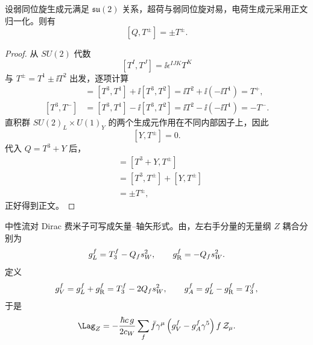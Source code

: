 \begin{proposition}[升降生成元的电荷对易关系]
设弱同位旋生成元满足 $\mathfrak{su}(2)$ 关系，超荷与弱同位旋对易，电荷生成元采用正文归一化。则有
\begin{equation}
{[Q,T^\pm]=\pm T^\pm.}
\label{eq:sm-w-charge-commutator-dp122}
\end{equation}
\end{proposition}
\begin{proof}
从 $SU(2)$ 代数
\[
[T^I,T^J]=\ii\epsilon^{IJK}T^K
\]
与 $T^\pm=T^1\pm\ii T^2$ 出发，逐项计算
\begin{align*}
[T^3,T^+]
&=[T^3,T^1]+\ii[T^3,T^2]
=\ii T^2+\ii(-\ii T^1)
=T^+,\\
[T^3,T^-]
&=[T^3,T^1]-\ii[T^3,T^2]
=\ii T^2-\ii(-\ii T^1)
=-T^-.
\end{align*}
直积群 $SU(2)_L\times U(1)_Y$ 的两个生成元作用在不同内部因子上，因此
\[
[Y,T^\pm]=0.
\]
代入 $Q=T^3+Y$ 后，
\begin{align*}
[Q,T^\pm]
&=[T^3+Y,T^\pm]\\
&=[T^3,T^\pm]+[Y,T^\pm]\\
&=\pm T^\pm,
\end{align*}
正好得到正文。
\end{proof}


\begin{definition}[$Z$ 流的手征与矢量轴矢耦合]
中性流对 Dirac 费米子可写成矢量--轴矢形式。由，左右手分量的无量纲 $Z$ 耦合分别为
\begin{equation}
{
 g_L^f=T_3^f-Q_fs_W^2,
 \qquad
 g_{\rm R}^f=-Q_fs_W^2.}
\label{eq:sm-z-chiral-couplings-dp68}
\end{equation}
定义
\begin{equation*}
 g_V^f=g_L^f+g_{\rm R}^f=T_3^f-2Q_fs_W^2,
 \qquad
 g_A^f=g_L^f-g_{\rm R}^f=T_3^f,
\end{equation*}
于是
\begin{equation}
 {
 \Lag_Z
 =-\frac{\hbar c\,g}{2c_W}
 \sum_f
 \bar f\gamma^\mu\left(g_V^f-g_A^f\gamma^5\right)f\,\mathcal Z_\mu.}
 \label{eq:z-current-lagrangian-dp11}
\end{equation}
\end{definition}

